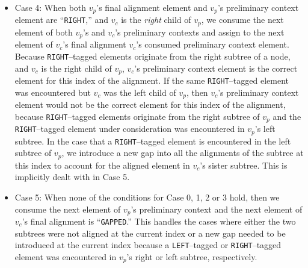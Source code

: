 \documentclass{bmcart}
\begin{document}
\begin{itemize}
  \item Case 4: When both $v_p$'s final alignment element and $v_p$'s preliminary context element are ``\texttt{RIGHT},'' and $v_c$ is the \textit{right} child of $v_p$, we consume the next element of both $v_p$'s and $v_c$'s preliminary contexts and assign to the next element of $v_c$'s final alignment $v_c$'s consumed preliminary context element.
  Because \texttt{RIGHT}--tagged elements originate from the right subtree of a node, and $v_c$ is the right child of $v_p$, $v_c$'s preliminary context element is the correct element for this index of the alignment.
  If the same \texttt{RIGHT}--tagged element was encountered but $v_c$ was the left child of $v_p$, then $v_c$'s preliminary context element would not be the correct element for this index of the alignment, because \texttt{RIGHT}--tagged elements originate from the right subtree of $v_p$ and the \texttt{RIGHT}--tagged element under consideration was encountered in $v_p$'s left subtree.
  In the case that a \texttt{RIGHT}--tagged element is encountered in the left subtree of $v_p$, we introduce a new gap into all the alignments of the subtree at this index to account for the aligned element in $v_c$'s sister subtree.
  This is implicitly dealt with in Case 5.
  
  \item Case 5: When none of the conditions for Case 0, 1, 2 or 3 hold, then we consume the next element of $v_p$'s preliminary context and the next element of $v_c$'s final alignment is ``\texttt{GAPPED}.''
  This handles the cases where either the two subtrees were not aligned at the current index or a new gap needed to be introduced at the current index because a \texttt{LEFT}--tagged or \texttt{RIGHT}--tagged element was encountered in $v_p$'s right or left subtree, respectively. 

\end{itemize}
\end{document}
